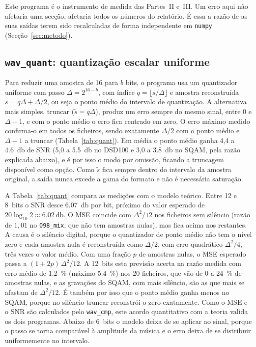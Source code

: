 \documentclass[a4paper,11pt]{article}
\newcommand{\prog}[1]{\texttt{#1}}
\begin{document}
Este programa é o instrumento de medida das Partes~II e~III. Um erro aqui não
afetaria uma secção, afetaria todos os números do relatório. É essa a razão de
as suas saídas terem sido recalculadas de forma independente em \prog{numpy}
(Secção~\ref{sec:metodo}).

\subsection{\prog{wav\_quant}: quantização escalar uniforme}
\label{sec:quant}
Para reduzir uma amostra de 16 para $b$ bits, o programa usa um quantizador
uniforme com passo $\Delta = 2^{16-b}$, com índice
$q = \lfloor s/\Delta \rfloor$ e amostra reconstruída
$\tilde{s} = q\Delta + \Delta/2$, ou seja o ponto médio do intervalo de
quantização. A alternativa mais simples, truncar ($\tilde{s} = q\Delta$), produz
um erro sempre do mesmo sinal, entre $0$ e $\Delta-1$, e com o ponto médio o
erro fica centrado em zero. O erro máximo medido confirma-o em todos os
ficheiros, sendo exatamente $\Delta/2$ com o ponto médio e $\Delta-1$ a truncar
(Tabela~\ref{tab:quant}). Em média o ponto médio ganha 4,4 a
\SI{4,6}{\decibel} de SNR (5,0 a \SI{5,5}{\decibel} no DSD100 e 3,0 a
\SI{3,8}{\decibel} no SQAM, pela razão explicada abaixo), e é por isso o modo
por omissão, ficando a truncagem disponível como opção. Como $\tilde{s}$ fica
sempre dentro do intervalo da amostra original, a saída nunca excede a gama do
formato e não é necessária saturação.

A Tabela~\ref{tab:quant} compara as medições com o modelo teórico. Entre 12 e
8~bits o SNR desce \SI{6,07}{\decibel} por bit, próximo do valor esperado de
$20\log_{10}2 \approx \SI{6,02}{\decibel}$. O MSE coincide com $\Delta^2/12$ nos
ficheiros sem silêncio (razão de $1{,}01$ no \texttt{098\_mix}, que não tem
amostras nulas), mas fica acima nos restantes. A causa é o silêncio digital,
porque o quantizador de ponto médio não tem o nível zero e cada amostra nula é
reconstruída como $\Delta/2$, com erro quadrático $\Delta^2/4$, três vezes o
valor médio. Com uma fração $p$ de amostras nulas, o MSE esperado passa a
$(1+2p)\,\Delta^2/12$. A 12~bits esta previsão acerta na razão medida com erro
médio de \SI{1,2}{\percent} (máximo \SI{5,4}{\percent}) nos 20 ficheiros, que
vão de 0 a \SI{24}{\percent} de amostras nulas, e as gravações do SQAM, com mais
silêncio, são as que mais se afastam de $\Delta^2/12$. É também por isso que o
ponto médio ganha menos no SQAM, porque no silêncio truncar reconstrói o zero
exatamente. Como o MSE e o SNR são calculados pelo \prog{wav\_cmp}, este acordo
quantitativo com a teoria valida os dois programas. Abaixo de 6~bits o modelo
deixa de se aplicar ao sinal, porque o passo se torna comparável à amplitude da
música e o erro deixa de se distribuir uniformemente no intervalo.
\end{document}
